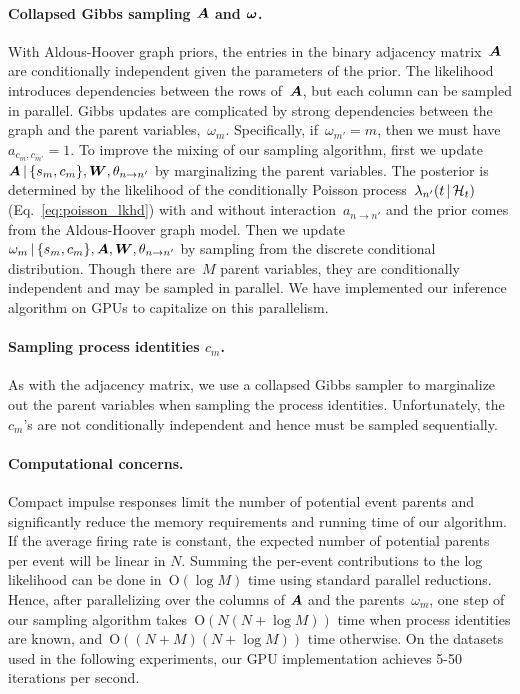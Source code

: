 \paragraph{Collapsed Gibbs sampling $\boldsymbol{A}$ and $\boldsymbol{\omega}$.}
With Aldous-Hoover graph priors, the entries in the binary adjacency
matrix~$\boldsymbol{A}$ are conditionally independent given the parameters of the
prior. The likelihood introduces dependencies between the rows
of~$\boldsymbol{A}$, but each column can be sampled in parallel. Gibbs updates
are complicated by strong dependencies between the graph and the
parent variables,~$\omega_m$. Specifically, if~${\omega_{m'}=m}$, then
we must have~${a_{c_{m},c_{m'}}=1}$. To improve the mixing of our
sampling algorithm, first we
update~${\boldsymbol{A}\,|\,\{s_m,c_m\},\boldsymbol{W},\theta_{n \to n'}}$ by marginalizing
the parent variables. The posterior is determined by the likelihood of
the conditionally Poisson process~${\lambda_{n'}(t\,|\, \mathcal{H}_t)}$
(Eq.~\ref{eq:poisson_lkhd}) with and without interaction~${a_{n
    \to n'}}$ and the prior comes from the Aldous-Hoover graph
model. Then we update~${\omega_m \,|\, \{s_m,c_m\},\boldsymbol{A},\boldsymbol{W},\theta_{n
    \to n'}}$ by sampling from the discrete conditional
distribution. Though there are~$M$ parent variables, they are
conditionally independent and may be sampled in parallel. We have
implemented our inference algorithm on GPUs to capitalize on this
parallelism.

\paragraph{Sampling process identities $c_m$.}
As with the adjacency matrix, we use a collapsed Gibbs sampler to
marginalize out the parent variables when sampling the process
identities. Unfortunately, the~$c_m$'s are not conditionally
independent and hence must be sampled sequentially.

\paragraph{Computational concerns.}
Compact impulse responses limit the number of potential event parents
and significantly reduce the memory requirements and running time of
our algorithm. If the average firing rate is constant, the expected
number of potential parents per event will be linear in $N$. Summing
the per-event contributions to the log likelihood can be done
in~${\mathrm{O}(\log M)}$ time using standard parallel
reductions. Hence, after parallelizing over the columns of $\boldsymbol{A}$ and
the parents~$\omega_m$, one step of our sampling algorithm
takes~${\mathrm{O}(N(N+\log M))}$ time when process identities are
known, and~${\mathrm{O}((N+M)(N+\log M))}$ time otherwise. On the
datasets used in the following experiments, our GPU
implementation
achieves
5-50 iterations per second.

